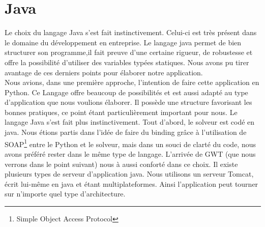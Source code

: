 \section{Java}
Le choix du langage Java s'est fait instinctivement. Celui-ci est très présent
dans le domaine du développement en entreprise. Le langage java permet de bien
structurer son programme,il fait preuve d'une certaine rigueur, de robustesse
et offre la possibilité d'utiliser des variables typées statiques. Nous avons pu
tirer avantage de ces derniers points pour élaborer notre application.\\
\newline
\indent
Nous avions, dans une première approche, l'intention de faire cette
application en Python. Ce Langage offre beaucoup de possibilités et est aussi adapté
au type d'application que nous voulions élaborer. Il possède une structure
favorisant les bonnes pratiques, ce point étant particulièrement important pour
nous. Le langage Java s'est fait plus instinctivement. Tout d'abord, le solveur est codé en java. Nous étions partis dans l'idée de faire du
binding grâce à l'utilisation de SOAP\footnote{Simple Object Access Protocol} entre le Python et le solveur, mais
dans un souci de clarté du code, nous avons préféré rester dans le même type de
langage. L'arrivée de GWT (que nous verrons dans le point suivant) nous à aussi
conforté dans ce choix.
\newline
\indent
Il existe plusieurs types de serveur d'application java. Nous utilisons un
serveur Tomcat, écrit lui-même en java et étant multiplateformes. Ainsi
l'application peut tourner sur n'importe quel type d'architecture.




